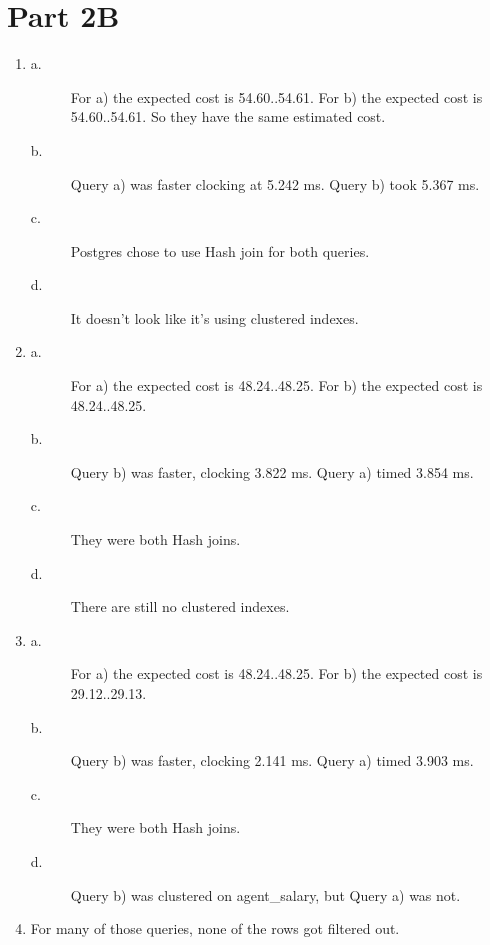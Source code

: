 \documentclass{article}
\begin{document}
\section*{Part 2B}
\begin{enumerate}
\item
\begin{description}
\item[a.]
For a) the expected cost is 54.60..54.61.
For b) the expected cost is 54.60..54.61.
So they have the same estimated cost.

\item[b.]
Query a) was faster clocking at 5.242 ms. Query b) took 5.367 ms.

\item[c.]
Postgres chose to use Hash join for both queries.

\item[d.]
It doesn't look like it's using clustered indexes.

\end{description}

\item
\begin{description}
\item[a.]
For a) the expected cost is 48.24..48.25.
For b) the expected cost is 48.24..48.25.

\item[b.]
Query b) was faster, clocking 3.822 ms. Query a) timed 3.854 ms.

\item[c.]
They were both Hash joins.

\item[d.]
There are still no clustered indexes.

\end{description}

\item
\begin{description}
\item[a.]
For a) the expected cost is 48.24..48.25.
For b) the expected cost is 29.12..29.13.

\item[b.]
Query b) was faster, clocking 2.141 ms. Query a) timed 3.903 ms.

\item[c.]
They were both Hash joins.

\item[d.]
Query b) was clustered on agent\_salary, but Query a) was not.

\end{description}

\item
For many of those queries, none of the rows got filtered out.

\end{enumerate}
\end{document}
